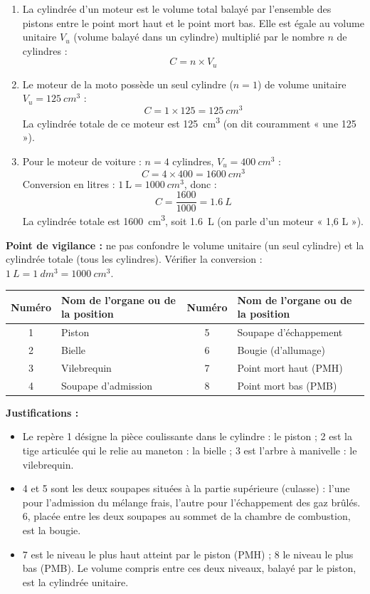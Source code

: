 \documentclass[11pt]{article}
\newcommand{\cle}[1]{{\popxbold\color{popdark}#1}}
\begin{document}
\begin{corrige}
\begin{enumerate}
\item La \cle{cylindrée} d'un moteur est le volume total balayé par l'ensemble des pistons entre le point mort haut et le point mort bas. Elle est égale au volume unitaire $V_u$ (volume balayé dans un cylindre) multiplié par le nombre $n$ de cylindres :
\[ C = n \times V_u \]
\item Le moteur de la moto possède un seul cylindre ($n = 1$) de volume unitaire $V_u = \SI{125}{cm^3}$ :
\[ C = 1 \times 125 = \SI{125}{cm^3} \]
La cylindrée totale de ce moteur est \SI{125}{cm^3} (on dit couramment « une 125 »).
\item Pour le moteur de voiture : $n = 4$ cylindres, $V_u = \SI{400}{cm^3}$ :
\[ C = 4 \times 400 = \SI{1600}{cm^3} \]
Conversion en litres : $1~\text{L} = \SI{1000}{cm^3}$, donc :
\[ C = \dfrac{1600}{1000} = \SI{1,6}{L} \]
La cylindrée totale est \SI{1600}{cm^3}, soit \SI{1,6}{L} (on parle d'un moteur « 1,6 L »).
\end{enumerate}
\textbf{Point de vigilance :} ne pas confondre le volume unitaire (un seul cylindre) et la cylindrée totale (tous les cylindres). Vérifier la conversion : $\SI{1}{L} = \SI{1}{dm^3} = \SI{1000}{cm^3}$.
\end{corrige}

\begin{corrige}
\begin{center}
\begin{tabularx}{\linewidth}{|c|X|c|X|}
\hline
\rowcolor{popblueL} Numéro & Nom de l'organe ou de la position & Numéro & Nom de l'organe ou de la position \\
\hline
1 & Piston & 5 & Soupape d'échappement \\
\hline
2 & Bielle & 6 & Bougie (d'allumage) \\
\hline
3 & Vilebrequin & 7 & Point mort haut (PMH) \\
\hline
4 & Soupape d'admission & 8 & Point mort bas (PMB) \\
\hline
\end{tabularx}
\end{center}
\textbf{Justifications :}
\begin{itemize}
\item Le repère 1 désigne la pièce coulissante dans le cylindre : le piston ; 2 est la tige articulée qui le relie au maneton : la bielle ; 3 est l'arbre à manivelle : le vilebrequin.
\item 4 et 5 sont les deux soupapes situées à la partie supérieure (culasse) : l'une pour l'admission du mélange frais, l'autre pour l'échappement des gaz brûlés. 6, placée entre les deux soupapes au sommet de la chambre de combustion, est la bougie.
\item 7 est le niveau le plus haut atteint par le piston (PMH) ; 8 le niveau le plus bas (PMB). Le volume compris entre ces deux niveaux, balayé par le piston, est la cylindrée unitaire.
\end{itemize}
\end{corrige}
\end{document}
